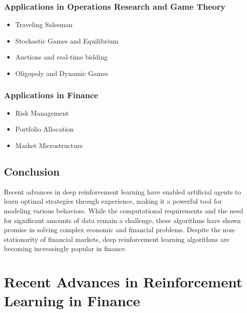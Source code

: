\documentclass{article}
\begin{document}
\subsubsection{Applications in Operations Research and Game Theory}
\begin{itemize}
\item Traveling Salesman
\item Stochastic Games and Equilibrium
\item Auctions and real-time bidding
\item Oligopoly and Dynamic Games
\end{itemize}

\subsubsection{Applications in Finance}
\begin{itemize}
\item Risk Management
\item Portfolio Allocation
\item Market Microstructure
\end{itemize}

\subsection{Conclusion}
Recent advances in deep reinforcement learning have enabled artificial agents to learn optimal strategies through experience, making it a powerful tool for modeling various behaviors. While the computational requirements and the need for significant amounts of data remain a challenge, these algorithms have shown promise in solving complex economic and financial problems. Despite the non-stationarity of financial markets, deep reinforcement learning algorithms are becoming increasingly popular in finance.

\section{Recent Advances in Reinforcement Learning in Finance}
\end{document}
